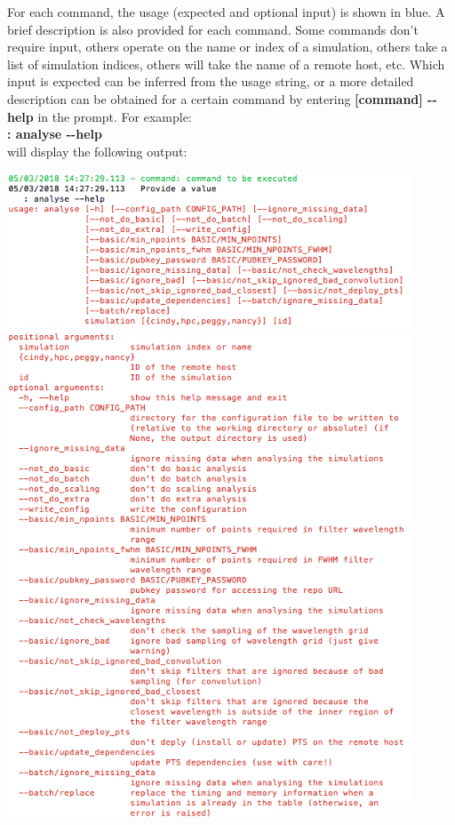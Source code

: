 \documentclass[15pt,a4paper,oneside,openright]{report}
\begin{document}
For each command, the usage (expected and optional input) is shown in blue. A brief description is also provided for each command. Some commands don't require input, others operate on the name or index of a simulation, others take a list of simulation indices, others will take the name of a remote host, etc. Which input is expected can be inferred from the usage string, or a more detailed description can be obtained for a certain command by entering \textbf{[command] -{}-help} in the prompt. For example:\\

\textbf{: analyse -{}-help} \\

will display the following output:

\begin{center}
\includegraphics[width=0.9\textwidth]{figures/help_analyse1.png}
\includegraphics[width=0.9\textwidth]{figures/help_analyse2.png}
\end{center}
\end{document}
